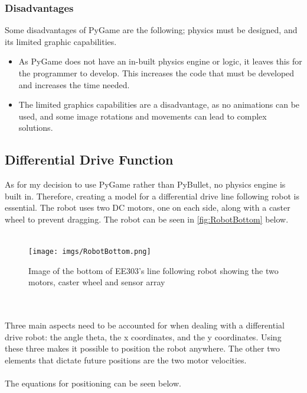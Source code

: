 \documentclass[a4paper,12pt]{article}
\begin{document}
\subsubsection{Disadvantages}

Some disadvantages of PyGame are the following; physics must be designed, and its limited graphic capabilities. 
\begin{itemize}
  \item As PyGame does not have an in-built physics engine or logic, it leaves this for the programmer to develop. This increases the code that must be developed and increases the time needed. 
  \item The limited graphics capabilities are a disadvantage, as no animations can be used, and some image rotations and movements can lead to complex solutions.

\end{itemize}


\subsection{Differential Drive Function}
As for my decision to use PyGame rather than PyBullet, no physics engine is built in. Therefore, creating a model for a differential drive line following robot is essential. The robot uses two DC motors, one on each side, along with a caster wheel to prevent dragging. The robot can be seen in \autoref{fig:RobotBottom} below.
\\\\
\begin{figure}[H]
\label{fig:1}{}
\centering
\texttt{[image: imgs/RobotBottom.png]}
\caption{Image of the bottom of EE303's line following robot showing the two motors, caster wheel and sensor array}
\label{fig:RobotBottom}
\end{figure}
\\\\
Three main aspects need to be accounted for when dealing with a differential drive robot: the angle theta, the x coordinates, and the y coordinates. Using these three makes it possible to position the robot anywhere. The other two elements that dictate future positions are the two motor velocities.
\\\\
The equations for positioning can be seen below.
\end{document}
